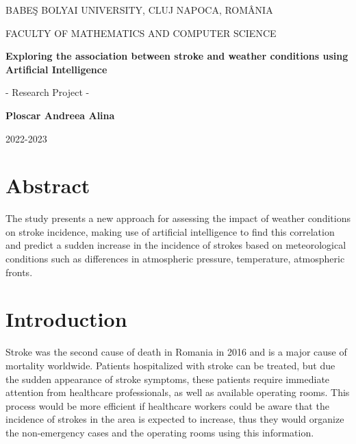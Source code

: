 \documentclass{article}
\begin{document}
\begin{titlepage}
\sloppy

\begin{center}
BABE\c S BOLYAI UNIVERSITY, CLUJ NAPOCA, ROM\^ ANIA

FACULTY OF MATHEMATICS AND COMPUTER SCIENCE

\vspace{4cm}

\Huge \textbf{Exploring the association between stroke and weather
conditions using Artificial Intelligence} 

\vspace{1cm}

\normalsize - Research Project -

\end{center}


\vspace{7cm}

\begin{flushright}
\Large{\textbf{Ploscar Andreea Alina}}
\end{flushright}

\vspace{4cm}

\begin{center}
2022-2023
\end{center}

\end{titlepage}


\tableofcontents

\newpage

\section{Abstract}

The study presents a new approach for assessing the impact of weather conditions on stroke incidence, making use of artificial intelligence to find this correlation and predict a sudden increase in the incidence of strokes based on meteorological conditions such as differences in atmospheric pressure, temperature, atmospheric fronts.

\section{Introduction}
\normalsize Stroke was the second cause of death in Romania in 2016 \cite{Donkor:2018dg} and is a major cause of mortality worldwide. Patients hospitalized with stroke can be treated, but due the sudden appearance of stroke symptoms, these patients require immediate attention from healthcare professionals, as well as available operating rooms. This process would be more efficient if healthcare workers could be aware that the incidence of strokes in the area is expected to increase, thus they would organize the non-emergency cases and the operating rooms using this information. 
\end{document}
